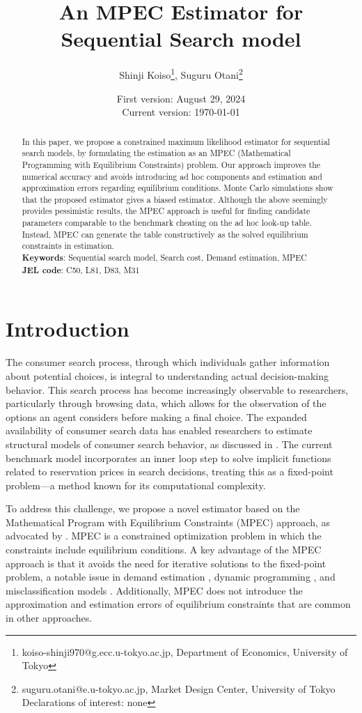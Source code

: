 \documentclass[12pt]{article}
\title{An MPEC Estimator for Sequential Search model}
\author{Shinji Koiso\thanks{koiso-shinji970@g.ecc.u-tokyo.ac.jp, Department of Economics, University of Tokyo}, Suguru Otani\thanks{suguru.otani@e.u-tokyo.ac.jp, Market Design Center, University of Tokyo\\Declarations of interest: none}}
\date{First version: August 29, 2024\\
Current version: \today}
\begin{document}
\maketitle

\begin{abstract}
\noindent
In this paper, we propose a constrained maximum likelihood estimator for sequential search models, by formulating the estimation as an MPEC (Mathematical Programming with Equilibrium Constraints) problem. 
Our approach improves the numerical accuracy and avoids introducing ad hoc components and estimation and approximation errors regarding equilibrium conditions. 
Monte Carlo simulations show that the proposed estimator gives a biased estimator.
Although the above seemingly provides pessimistic results, the MPEC approach is useful for finding candidate parameters comparable to the benchmark cheating on the ad hoc look-up table.
Instead, MPEC can generate the table constructively as the solved equilibrium constraints in estimation.
\\
\textbf{Keywords}: Sequential search model, Search cost, Demand estimation, MPEC \\
\textbf{JEL code}: C50, L81, D83, M31
\end{abstract}

\section{Introduction}

The consumer search process, through which individuals gather information about potential choices, is integral to understanding actual decision-making behavior. This search process has become increasingly observable to researchers, particularly through browsing data, which allows for the observation of the options an agent considers before making a final choice. The expanded availability of consumer search data has enabled researchers to estimate structural models of consumer search behavior, as discussed in \cite{ursu2023sequential}. The current benchmark model incorporates an inner loop step to solve implicit functions related to reservation prices in search decisions, treating this as a fixed-point problem—a method known for its computational complexity.

To address this challenge, we propose a novel estimator based on the Mathematical Program with Equilibrium Constraints (MPEC) approach, as advocated by \cite{su2012constrained}. MPEC is a constrained optimization problem in which the constraints include equilibrium conditions. A key advantage of the MPEC approach is that it avoids the need for iterative solutions to the fixed-point problem, a notable issue in demand estimation \citep{dube2012improving}, dynamic programming \citep{su2012constrained,egesdal2015estimating}, and misclassification models \citep{lu2014mpec}. Additionally, MPEC does not introduce the approximation and estimation errors of equilibrium constraints that are common in other approaches.
\end{document}

